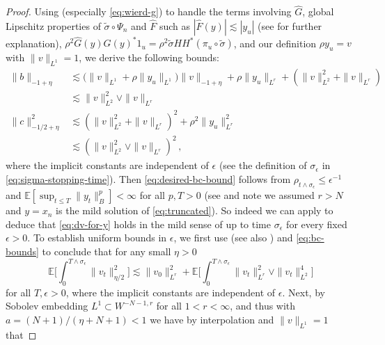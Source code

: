 \documentclass[final]{amsart}
\numberwithin{thm}{section}
\numberwithin{equation}{section}
\newcommand{\E}{\mathbb{E}}
\begin{document}
\begin{proof}
    Using  (especially \eqref{eq:wierd-g}) to handle the terms involving $\hat G$, global Lipschitz properties of $\tilde \sigma \circ \Psi_n$ and $\hat F$ such as $|\hat F(y)| \lesssim |y_u|$ (see  for further explanation), 
    $\rho^2\hat G(y)\hat G(y)^*1_u = \rho^2 \tilde{\sigma}HH^* (\pi_u\circ\tilde{\sigma})$, and our definition $\rho y_u = v$ with $\|v\|_{L^1} = 1$, we derive the following bounds:
    \begin{equation}\label{eq:bc-bounds}
        \begin{aligned}
            \|b\|_{-1 + \eta} &\lesssim \Big(\|v\|_{L^1} + \rho\|y_u\|_{L^1} \Big)\|v\|_{-1+\eta} + \rho\|y_u\|_{L^r} + (\|v\|_{L^2}^2 + \|v\|_{L^r}) \\
            &\lesssim \|v\|_{L^2}^2 \vee \|v\|_{L^r} \\
            \|c\|_{-1/2+\eta}^2 &\lesssim (\|v\|_{L^2}^2 + \|v\|_{L^r})^2 + \rho^2\|y_u\|_{L^r}^2 \\
            &\lesssim (\|v\|_{L^2}^2 \vee \|v\|_{L^r})^2 \,,
        \end{aligned}
    \end{equation}
    where the implicit constants are independent of $\epsilon$ (see the definition of $\sigma_\epsilon$ in \eqref{eq:sigma-stopping-time}). 
    Then \eqref{eq:desired-bc-bound} follows from $\rho_{t\wedge\sigma_\epsilon} \leq \epsilon^{-1}$ and $\E[\sup_{t \leq T} \|y_t\|_B^p] < \infty$ for all $p,T > 0$ (see  and note we assumed $r > N$ and $y = x_n$ is the mild solution of \eqref{eq:truncated}). So indeed we can apply  to deduce that \eqref{eq:dv-for-y} holds in the mild sense of  up to time $\sigma_\epsilon$ for every fixed $\epsilon > 0$. To establish uniform bounds in $\epsilon$, we first use  (see also ) and \eqref{eq:bc-bounds} to conclude that for any small $\eta > 0$
    \begin{equation}\label{eq:bound-on-v-sigma-epsilon}
        \E\Big[\int_0^{T \wedge \sigma_\epsilon} \|v_t\|_{\eta/2}^2\Big] \lesssim \|v_0\|_{L^r}^2 + \E\Big[\int_0^{T \wedge \sigma_\epsilon} \|v_t\|_{L^r}^2 \vee \|v_t\|_{L^2}^4\Big]
    \end{equation}
    for all $T,\epsilon > 0$, where the implicit constants are independent of $\epsilon$. Next, by Sobolev embedding $L^1 \subset W^{-N-1,r}$ for all $1 < r < \infty$, and thus with $a = (N+1)/(\eta+N+1) < 1$ we have by interpolation and $\|v\|_{L^1} = 1$ that

\end{proof}
\end{document}
